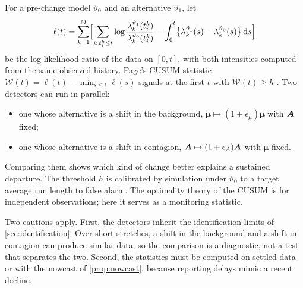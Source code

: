 \begin{remark}\label{rem:fc-cusum}
For a pre-change model $\vartheta_0$ and an alternative $\vartheta_1$, let
\[
\ell(t)=\sum_{k=1}^{M}\Bigl[\sum_{i:\,t^k_i\le t}\log\frac{\lambda^{\vartheta_1}_k(t^k_i)}{\lambda^{\vartheta_0}_k(t^k_i)}
-\int_0^t\bigl\{\lambda^{\vartheta_1}_k(s)-\lambda^{\vartheta_0}_k(s)\bigr\}\,\mathrm{d} s\Bigr]
\]
be the log-likelihood ratio of the data on $[0,t]$, with both intensities computed from
the same observed history. Page's CUSUM statistic
$\mathcal W(t)=\ell(t)-\min_{s\le t}\ell(s)$ signals at the first $t$ with
$\mathcal W(t)\ge h$ \citep{page1954}. Two detectors can run in parallel:
\begin{itemize}
  \item one whose alternative is a shift in the background, $\bm\mu\mapsto(1+\epsilon_\mu)\bm\mu$
  with $\bm{A}$ fixed;
  \item one whose alternative is a shift in contagion,
  $\bm{A}\mapsto(1+\epsilon_A)\bm{A}$ with $\bm\mu$ fixed.
\end{itemize}
Comparing them shows which kind of change better explains a sustained departure. The
threshold $h$ is calibrated by simulation under $\vartheta_0$ to a target average run
length to false alarm. The optimality theory of the CUSUM is for independent
observations; here it serves as a monitoring statistic.

Two cautions apply. First, the detectors inherit the identification limits of
\cref{sec:identification}. Over short stretches, a shift in the background and a shift
in contagion can produce similar data, so the comparison is a diagnostic, not a test
that separates the two. Second, the statistics must be computed on settled data or with
the nowcast of \cref{prop:nowcast}, because reporting delays mimic a recent decline.
\end{remark}
